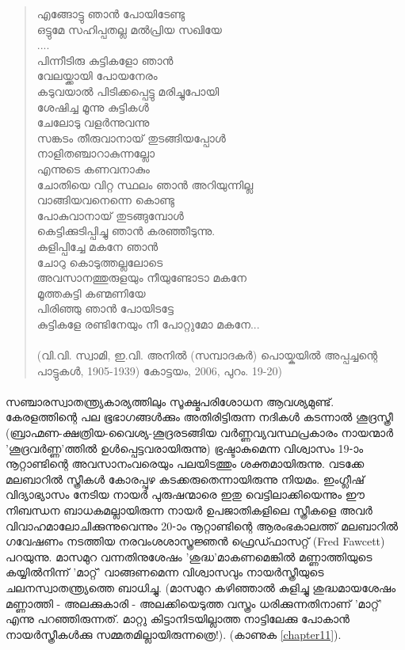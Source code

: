 \begin{tcolorbox}[%
 breakable, %
  arc=0mm, 
  left=1pt, right = 1pt, 
  boxrule=0mm,
  colback = {blue!10}, %
]
\begin{quote}
എങ്ങോട്ടു ഞാൻ പോയിടേണ്ടു\\
ഒട്ടുമേ സഹിപ്പതല്ല മൽപ്രിയ സഖിയേ\\
....\\
പിന്നീടിരു കുട്ടികളോ ഞാൻ\\
വേലയ്ക്കായി പോയനേരം\\
കടുവയാൽ പിടിക്കപ്പെട്ടു മരിച്ചുപോയി\\
ശേഷിച്ച മൂന്നു കുട്ടികൾ\\
ചേലോടു വളർന്നുവന്നു\\
സങ്കടം തീരുവാനായ് തുടങ്ങിയപ്പോൾ\\
നാളിതഞ്ചാറാകുന്നല്ലോ\\
എന്നുടെ കണവനാകും\\
ചോതിയെ വിറ്റ സ്ഥലം ഞാൻ അറിയുന്നില്ല\\
വാങ്ങിയവനെന്നെ കൊണ്ടു\\
പോകുവാനായ് തുടങ്ങുമ്പോൾ\\
കെട്ടിക്കുടിപ്പിച്ചു ഞാൻ കരഞ്ഞീടുന്നു.\\
കുളിപ്പിച്ചേ മകനേ ഞാൻ\\
ചോറു കൊടുത്തല്ലലോടെ\\
അവസാനത്തുരുളയും നീയുണ്ടോടാ മകനേ\\
മൂത്തകുട്ടി കണ്മണിയേ\\
പിരിഞ്ഞു ഞാൻ പോയിടട്ടേ\\
കുട്ടികളേ രണ്ടിനേയും നീ പോറ്റുമോ മകനേ...\\
\\(വി.വി. സ്വാമി, ഇ.വി. അനിൽ (സമ്പാദകർ) പൊയ്കയിൽ അപ്പച്ചന്റെ പാട്ടുകൾ, 1905-1939) കോട്ടയം, 2006, പുറം. 19-20)
\end{quote}
\end{tcolorbox}

\paragraph{}സഞ്ചാരസ്വാതന്ത്ര്യകാര്യത്തിലും സൂക്ഷ്മപരിശോധന ആവശ്യമുണ്ട്. കേരളത്തിന്റെ പല ഭൂഭാഗങ്ങൾക്കും അതിരിട്ടിരുന്ന നദികൾ കടന്നാൽ ശൂദ്രസ്ത്രീ (ബ്രാഹ്മണ-ക്ഷത്രിയ-വൈശ്യ-ശൂദ്രരടങ്ങിയ വർണ്ണവ്യവസ്ഥപ്രകാരം നായന്മാർ 'ശൂദ്രവർണ്ണ'ത്തിൽ ഉൾപ്പെട്ടവരായിരുന്നു) ഭ്രഷ്ടാകുമെന്ന വിശ്വാസം 19-ാം നൂറ്റാണ്ടിന്റെ അവസാനംവരെയും പലയിടത്തും ശക്തമായിരുന്നു. വടക്കേ മലബാറിൽ സ്ത്രീകൾ കോരപ്പുഴ കടക്കരുതെന്നായിരുന്നു നിയമം. ഇംഗ്ലീഷ് വിദ്യാഭ്യാസം നേടിയ നായർ പുരുഷന്മാരെ ഇതു വെട്ടിലാക്കിയെന്നും ഈ നിബന്ധന ബാധകമല്ലായിരുന്ന നായർ ഉപജാതികളിലെ സ്ത്രീകളെ അവർ വിവാഹമാലോചിക്കുന്നുവെന്നും 20-ാം നൂറ്റാണ്ടിന്റെ ആരംഭകാലത്ത് മലബാറിൽ ഗവേഷണം നടത്തിയ നരവംശശാസ്ത്രജ്ഞൻ ഫ്രെഡ്ഫാസറ്റ് (Fred Fawcett) പറയുന്നു. മാസമുറ വന്നതിനുശേഷം 'ശുദ്ധ'മാകണമെങ്കിൽ മണ്ണാത്തിയുടെ കയ്യിൽനിന്ന് 'മാറ്റ്' വാങ്ങണമെന്ന വിശ്വാസവും നായർസ്ത്രീയുടെ ചലനസ്വാതന്ത്ര്യത്തെ ബാധിച്ചു. (മാസമുറ കഴിഞ്ഞാൽ കുളിച്ചു ശുദ്ധമായശേഷം മണ്ണാത്തി - അലക്കുകാരി - അലക്കിയെടുത്ത വസ്ത്രം ധരിക്കുന്നതിനാണ് 'മാറ്റ്' എന്നു പറഞ്ഞിരുന്നത്. മാറ്റു കിട്ടാനിടയില്ലാത്ത നാട്ടിലേക്കു പോകാൻ നായർസ്ത്രീകൾക്കു സമ്മതമില്ലായിരുന്നത്രെ!). (കാണുക \ref{chapter11}).

